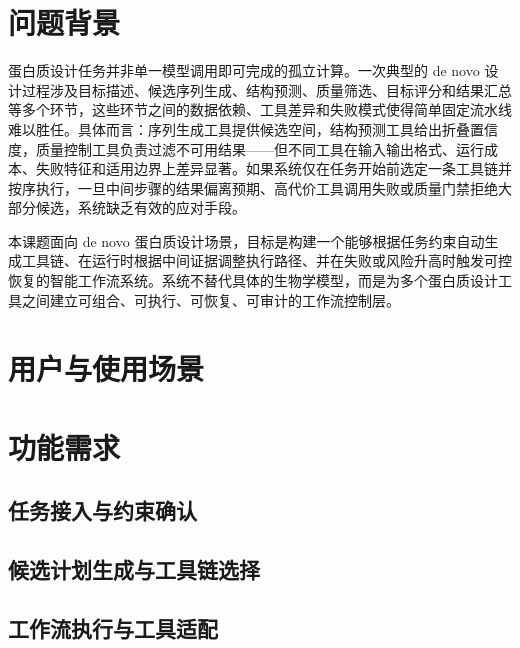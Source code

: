 
\section{问题背景}

蛋白质设计任务并非单一模型调用即可完成的孤立计算。一次典型的 de novo 设计过程涉及目标描述、候选序列生成、结构预测、质量筛选、目标评分和结果汇总等多个环节，这些环节之间的数据依赖、工具差异和失败模式使得简单固定流水线难以胜任。具体而言：序列生成工具提供候选空间，结构预测工具给出折叠置信度，质量控制工具负责过滤不可用结果——但不同工具在输入输出格式、运行成本、失败特征和适用边界上差异显著。如果系统仅在任务开始前选定一条工具链并按序执行，一旦中间步骤的结果偏离预期、高代价工具调用失败或质量门禁拒绝大部分候选，系统缺乏有效的应对手段。

本课题面向 de novo 蛋白质设计场景，目标是构建一个能够根据任务约束自动生成工具链、在运行时根据中间证据调整执行路径、并在失败或风险升高时触发可控恢复的智能工作流系统。系统不替代具体的生物学模型，而是为多个蛋白质设计工具之间建立可组合、可执行、可恢复、可审计的工作流控制层。

\section{用户与使用场景}


\section{功能需求}

\subsection{任务接入与约束确认}


\subsection{候选计划生成与工具链选择}


\subsection{工作流执行与工具适配}


